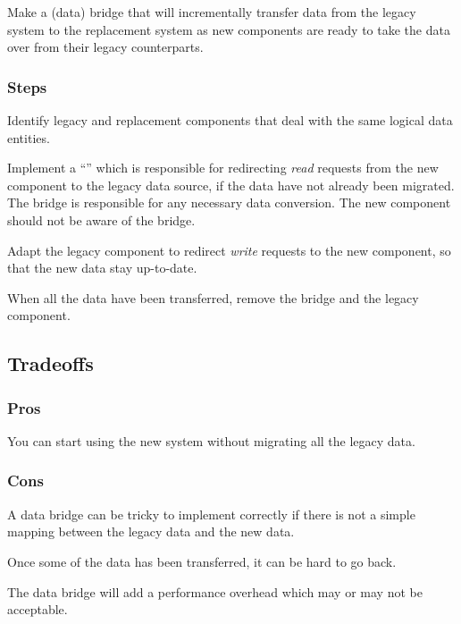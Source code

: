 \documentclass[a4paper,10pt,twoside]{book}
\begin{document}
Make a (data) bridge that will incrementally transfer data from the legacy system to the replacement system as new components are ready to take the data over from their legacy counterparts.

\subsubsection*{Steps}

\begin{bulletlist}
\item Identify legacy and replacement components that deal with the same logical data entities.

\item Implement a ``'' which is responsible for redirecting \emph{read} requests from the new component to the legacy data source, if the data have not already been migrated. The bridge is responsible for any necessary data conversion. The new component should not be aware of the bridge.

\item Adapt the legacy component to redirect \emph{write} requests to the new component, so that the new data stay up-to-date.

\item When all the data have been transferred, remove the bridge and the legacy component.
\end{bulletlist}

\subsection*{Tradeoffs}

\subsubsection*{Pros}

\begin{bulletlist}
\item You can start using the new system without migrating all the legacy data.
\end{bulletlist}

\subsubsection*{Cons}

\begin{bulletlist}
\item A data bridge can be tricky to implement correctly if there is not a simple mapping between the legacy data and the new data.

\item Once some of the data has been transferred, it can be hard to go back.

\item The data bridge will add a performance overhead which may or may not be acceptable.
\end{bulletlist}
\end{document}
